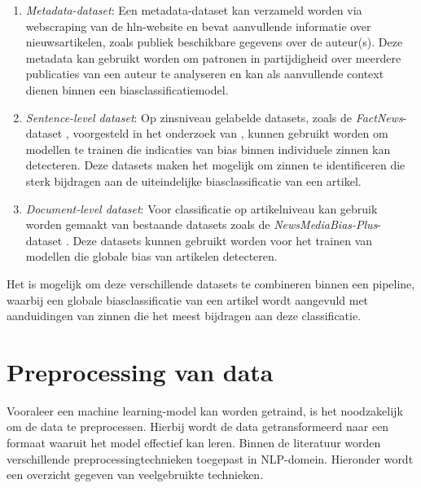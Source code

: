 \begin{enumerate}
    \item \textit{Metadata-dataset}: Een metadata-dataset kan verzameld worden via webscraping van de \gls{hln}-website en bevat aanvullende informatie over nieuwsartikelen, zoals publiek beschikbare gegevens over de auteur(s). Deze metadata kan gebruikt worden om patronen in partijdigheid over meerdere publicaties van een auteur te analyseren en kan als aanvullende context dienen binnen een biasclassificatiemodel.
    \item \textit{Sentence-level dataset}: Op zinsniveau gelabelde datasets, zoals de \textit{FactNews}-dataset \autocite{Vargas2024}, voorgesteld in het onderzoek van \textcite{Vargas2023}, kunnen gebruikt worden om modellen te trainen die indicaties van bias binnen individuele zinnen kan detecteren. Deze datasets maken het mogelijk om zinnen te identificeren die sterk bijdragen aan de uiteindelijke biasclassificatie van een artikel.
    \item \textit{Document-level dataset}: Voor classificatie op artikelniveau kan gebruik worden gemaakt van bestaande datasets zoals de \textit{NewsMediaBias-Plus}-dataset \autocite{Raza2024}. Deze datasets kunnen gebruikt worden voor het trainen van modellen die globale bias van artikelen detecteren.
\end{enumerate}

Het is mogelijk om deze verschillende datasets te combineren binnen een pipeline, waarbij een globale biasclassificatie van een artikel wordt aangevuld met aanduidingen van zinnen die het meest bijdragen aan deze classificatie.

\section{Preprocessing van data}
\label{sec:preprocessing-van-data}

Vooraleer een machine learning-model kan worden getraind, is het noodzakelijk om de data te preprocessen. Hierbij wordt de data getransformeerd naar een formaat waaruit het model effectief kan leren. Binnen de literatuur worden verschillende preprocessingtechnieken toegepast in NLP-domein. Hieronder wordt een overzicht gegeven van veelgebruikte technieken.

